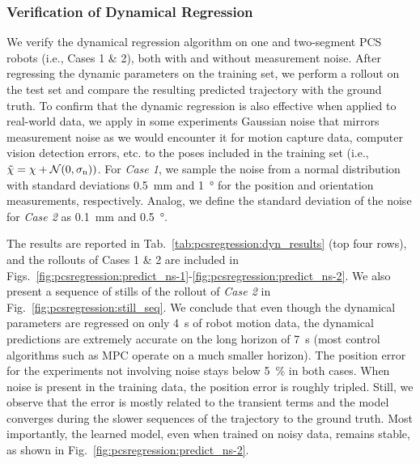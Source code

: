 \subsubsection{Verification of Dynamical Regression}
We verify the dynamical regression algorithm on one and two-segment \gls{PCS} robots (i.e., Cases 1 \& 2), both with and without measurement noise.
After regressing the dynamic parameters on the training set, we perform a rollout on the test set and compare the resulting predicted trajectory with the ground truth.
To confirm that the dynamic regression is also effective when applied to real-world data, we apply in some experiments Gaussian noise that mirrors measurement noise as we would encounter it for motion capture data, computer vision detection errors, etc. to the poses included in the training set (i.e., $\Tilde{\chi} = \chi + \mathcal{N}(0, \sigma_\mathrm{n}))$.
For \emph{Case 1}, we sample the noise from a normal distribution with standard deviations \SI{0.5}{mm} and \SI{1}{\degree} for the position and orientation measurements, respectively.
Analog, we define the standard deviation of the noise for \emph{Case 2} as \SI{0.1}{mm} and \SI{0.5}{\degree}.

The results are reported in Tab.~\ref{tab:pcsregression:dyn_results} (top four rows), and the rollouts of Cases 1 \& 2 are included in Figs.~\ref{fig:pcsregression:predict_ns-1}-\ref{fig:pcsregression:predict_ns-2}. We also present a sequence of stills of the rollout of \emph{Case 2} in Fig.~\ref{fig:pcsregression:still_seq}.
We conclude that even though the dynamical parameters are regressed on only \SI{4}{s} of robot motion data, the dynamical predictions are extremely accurate on the long horizon of \SI{7}{s} (most control algorithms such as \gls{MPC} operate on a much smaller horizon). The position error for the experiments not involving noise stays below \SI{5}{\percent} in both cases.
When noise is present in the training data, the position error is roughly tripled. Still, we observe that the error is mostly related to the transient terms and the model converges during the slower sequences of the trajectory to the ground truth. Most importantly, the learned model, even when trained on noisy data, remains stable, as shown in Fig.~\ref{fig:pcsregression:predict_ns-2}.

